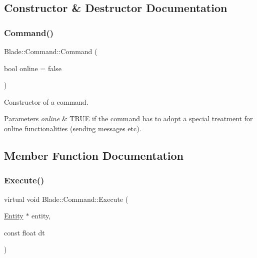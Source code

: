 \subsection{Constructor \& Destructor Documentation}
\mbox{\label{class_blade_1_1_command_ad2d8d0d0f38cb5e3142ae4876e041946}} 
\subsubsection{\texorpdfstring{Command()}{Command()}}
{\footnotesize\ttfamily Blade\+::\+Command\+::\+Command (\begin{DoxyParamCaption}\item[{bool}]{online = {\ttfamily false} }\end{DoxyParamCaption})\hspace{0.3cm}{\ttfamily [inline]}}



Constructor of a command. 


\begin{DoxyParams}{Parameters}
{\em online} & T\+R\+UE if the command has to adopt a special treatment for online functionalities (sending messages etc). \\
\hline
\end{DoxyParams}


\subsection{Member Function Documentation}
\mbox{\label{class_blade_1_1_command_a9110a3b9580a9e820c9318cf96bb6c41}} 
\subsubsection{\texorpdfstring{Execute()}{Execute()}}
{\footnotesize\ttfamily virtual void Blade\+::\+Command\+::\+Execute (\begin{DoxyParamCaption}\item[{\hyperlink{class_blade_1_1_entity}{Entity} $\ast$}]{entity,  }\item[{const float}]{dt }\end{DoxyParamCaption})\hspace{0.3cm}{\ttfamily [pure virtual]}}



